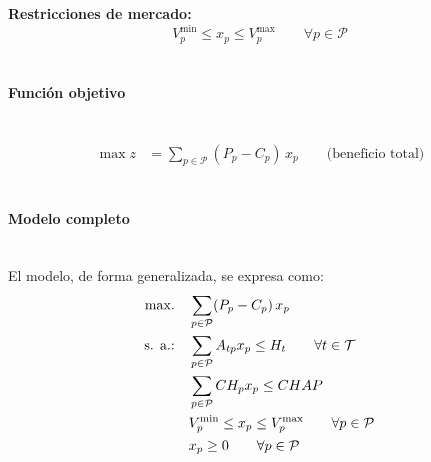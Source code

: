 \noindent
\textbf{Restricciones de mercado:}
\begin{equation}
    V^{\min}_p \leq x_p \leq V^{\max}_p \qquad \forall p \in \mathcal{P}
\end{equation}
\\

\paragraph{Función objetivo}\mbox{}\\

\begin{align}
    \max z &= \sum_{p \in \mathcal{P}} (P_p - C_p)\, x_p \qquad \mbox{(beneficio total)}
\end{align}
\\

\paragraph{Modelo completo}\mbox{}\\
El modelo, de forma generalizada, se expresa como:
\\
\begin{align}
\mbox{max.} \quad & \sum_{p \in \mathcal{P}} (P_p - C_p)\, x_p \notag \\
\mbox{s. a.:} \quad & \sum_{p \in \mathcal{P}} A_{tp} x_p \leq H_t \qquad \forall t \in \mathcal{T} \notag \\
& \sum_{p \in \mathcal{P}} CH_p x_p \leq CHAP \notag \\
& V^{\min}_p \leq x_p \leq V^{\max}_p \qquad \forall p \in \mathcal{P} \notag \\
& x_p \geq 0 \qquad \forall p \in \mathcal{P} \notag
\end{align}
